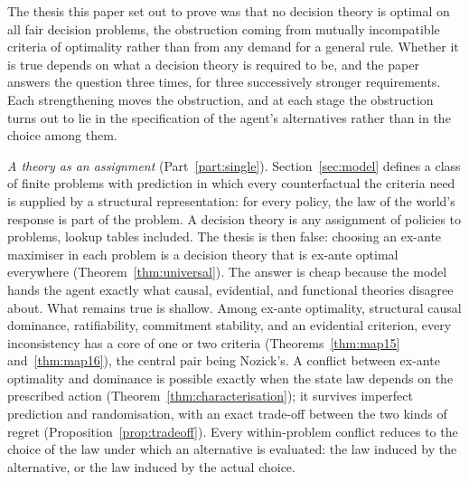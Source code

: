 The thesis this paper set out to prove was that no decision theory is optimal on all fair decision
problems, the obstruction coming from mutually incompatible criteria of optimality rather than from
any demand for a general rule. Whether it is true depends on what a decision theory is required to
be, and the paper answers the question three times, for three successively stronger requirements.
Each strengthening moves the obstruction, and at each stage the obstruction turns out to lie in the
specification of the agent's alternatives rather than in the choice among them.

\emph{A theory as an assignment} (Part~\ref{part:single}). Section~\ref{sec:model} defines a class of
finite problems with prediction in which every counterfactual the criteria need is supplied by a
structural representation: for every policy, the law of the world's response is part of the problem.
A decision theory is any assignment of policies to problems, lookup tables included. The thesis is
then false: choosing an ex-ante maximiser in each problem is a decision theory that is ex-ante optimal
everywhere (Theorem~\ref{thm:universal}). The answer is cheap because the model hands the agent exactly
what causal, evidential, and functional theories disagree about. What remains true is shallow. Among
ex-ante optimality, structural causal dominance, ratifiability, commitment stability, and an evidential
criterion, every inconsistency has a core of one or two criteria (Theorems~\ref{thm:map15}
and~\ref{thm:map16}), the central pair being Nozick's. A conflict between ex-ante optimality and
dominance is possible exactly when the state law depends on the prescribed action
(Theorem~\ref{thm:characterisation}); it survives imperfect prediction and randomisation, with an exact
trade-off between the two kinds of regret (Proposition~\ref{prop:tradeoff}). Every within-problem
conflict reduces to the choice of the law under which an alternative is evaluated: the law induced by
the alternative, or the law induced by the actual choice.

